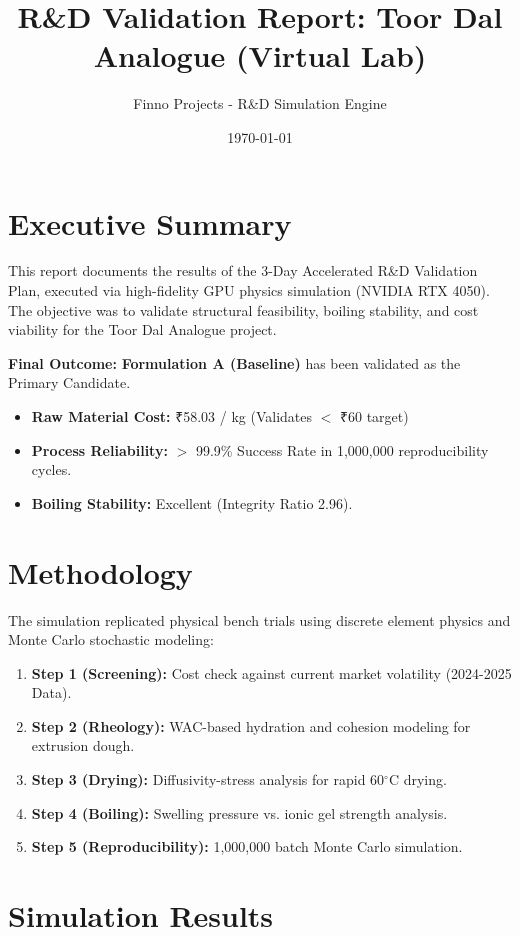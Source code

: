 \documentclass{article}
\title{\textbf{R\&D Validation Report: Toor Dal Analogue (Virtual Lab)}}
\author{Finno Projects - R\&D Simulation Engine}
\date{\today}
\begin{document}
\maketitle

\section{Executive Summary}
This report documents the results of the 3-Day Accelerated R\&D Validation Plan, executed via high-fidelity GPU physics simulation (NVIDIA RTX 4050). The objective was to validate structural feasibility, boiling stability, and cost viability for the Toor Dal Analogue project.

\textbf{Final Outcome:} \textbf{Formulation A (Baseline)} has been validated as the Primary Candidate.
\begin{itemize}
    \item \textbf{Raw Material Cost:} ₹58.03 / kg (Validates $<$ ₹60 target)
    \item \textbf{Process Reliability:} $>$ 99.9\% Success Rate in 1,000,000 reproducibility cycles.
    \item \textbf{Boiling Stability:} Excellent (Integrity Ratio 2.96).
\end{itemize}

\section{Methodology}
The simulation replicated physical bench trials using discrete element physics and Monte Carlo stochastic modeling:
\begin{enumerate}
    \item \textbf{Step 1 (Screening):} Cost check against current market volatility (2024-2025 Data).
    \item \textbf{Step 2 (Rheology):} WAC-based hydration and cohesion modeling for extrusion dough.
    \item \textbf{Step 3 (Drying):} Diffusivity-stress analysis for rapid 60$^\circ$C drying.
    \item \textbf{Step 4 (Boiling):} Swelling pressure vs. ionic gel strength analysis.
    \item \textbf{Step 5 (Reproducibility):} 1,000,000 batch Monte Carlo simulation.
\end{enumerate}

\section{Simulation Results}
\end{document}
